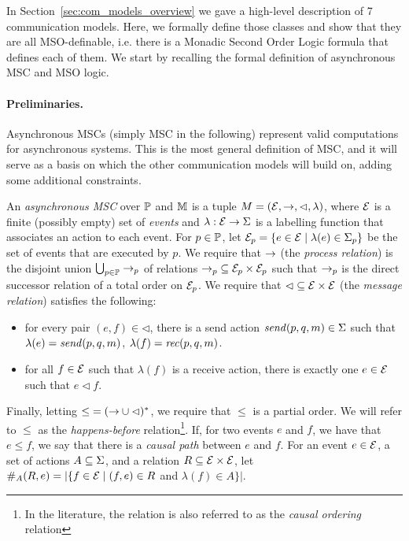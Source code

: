 

In Section~\ref{sec:com_models_overview} we gave a high-level description of 7 communication models. Here, we formally define those classes and  show that they are all MSO-definable, i.e. there is a Monadic Second Order Logic formula that defines each of them. 
We start by  recalling the formal definition of asynchronous MSC and MSO logic.

\paragraph{\bf Preliminaries.}
Asynchronous MSCs (simply MSC in the following) represent valid computations for asynchronous systems. 
This is the most general definition of MSC, and it will serve as a basis on which the other communication models 
will build on,  adding some additional constraints. 


\begin{definition}
An \emph{asynchronous MSC}  over $\Procs$ and $\Msg$ is a tuple $\msc = (\Events,\procrel,\lhd,\lambda)$, where $\Events$ is a finite (possibly empty) set of \emph{events} and $\lambda: \Events \to \Act$ is a labelling function that associates an action to each event. For $p \in \Procs$, let $\Events_p = \{e \in \Events \mid \lambda(e) \in \pAct{p}\}$ be the set of events that are executed by $p$. We require that $\procrel$ (the \emph{process relation}) is the disjoint union $\bigcup_{p \in \Procs} \procrel_p$ of relations ${\procrel_p} \subseteq \Events_p \times \Events_p$ such that $\procrel_p$ is the direct successor relation of a total order on $\Events_p$.  We require that ${\lhd} \subseteq \Events \times \Events$ (the \emph{message relation}) satisfies the following:
\begin{itemize}%
\item[(1)] for every pair $(e,f) \in {\lhd}$, there is a send action $\sact{p}{q}{\msg} \in \Act$ such that $\lambda(e) = \sact{p}{q}{\msg}$, $\lambda(f) = \ract{p}{q}{\msg}$.
\item[(2)] for all $f \in \Events$ such that $\lambda(f)$ is a receive action, there is exactly one $e \in \Events$ such that $e \lhd f$.
\end{itemize}
Finally, letting ${\le} = ({\procrel} \cup {\lhd})^\ast$,
we require that $\le$ is a partial order. We will refer to $\le$ as the \emph{happens-before} relation\footnote{In the literature, the relation is also referred to as the \emph{causal ordering} relation}. If, for two events $e$ and $f$, we have that $e \le f$, we   say that there is a \emph{causal path} between $e$ and $f$.
For an event $e \in \Events$, a set of actions $A \subseteq \Act$, and a relation $\rel \subseteq \Events \times \Events$,
let $\sametype{e}{A}{\rel} = |\{f \in \Events \mid (f,e) \in \rel$ and $\lambda(f) \in A\}|$.
\end{definition}

